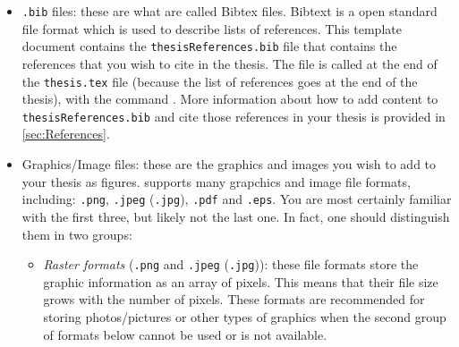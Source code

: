 \documentclass[11pt,twoside,openright]{report}
\begin{document}
\begin{itemize}[noitemsep]
\begin{itemize}[noitemsep]
        \item Existing packages that can simply be loaded in \verb|.tex| or \verb|.ply|. Existing packages are loaded using the \verb|\usepackage{...}| function and you can see at the beginning of the \verb|thesis.tex| file that this thesis template already loads a dozen packages. While we think these packages should already enable you to do most things you may wish to do in a thesis (e.g. add URLs or having figures with sub-figures), you may have additional needs. For this, simply search the resources listed in \cref{sec:Resources}.
    \end{itemize}
  
  \item \verb|.bib| files: these are what are called Bibtex files. Bibtext is a open standard file format which is used to describe lists of references. This template document contains the \verb|thesisReferences.bib| file that contains the references that you wish to cite in the thesis. The file is called at the end of the \verb|thesis.tex| file (because the list of references goes at the end of the thesis), with the command \verb||.
  More information about how to add content to \verb|thesisReferences.bib| and cite those references in your thesis is provided in \cref{sec:References}.
  
  \item Graphics/Image files: these are the graphics and images you wish to add to your thesis as figures.  supports many grapchics and image file formats, including: \verb|.png|, \verb|.jpeg| (\verb|.jpg|), \verb|.pdf| and \verb|.eps|. 
  You are most certainly familiar with the first three, but likely not the last one. 
  In fact, one should distinguish them in two groups:
      \begin{itemize}[noitemsep]
        \item \emph{Raster formats} (\verb|.png| and \verb|.jpeg| (\verb|.jpg|)): these file formats store the graphic information as an array of pixels. This means that their file size grows with the number of pixels. These formats are recommended for storing photos/pictures or other types of graphics when the second group of formats below cannot be used or is not available. 
        

\end{itemize}
\end{itemize}
\end{document}
